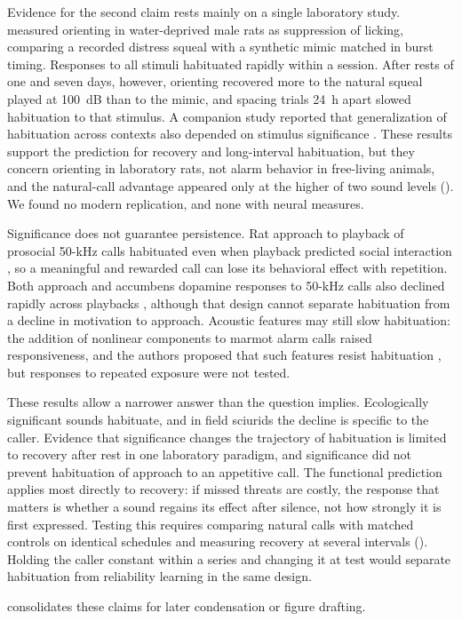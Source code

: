 Evidence for the second claim rests mainly on a single laboratory study. \citet{EvansHammond1983a} measured orienting in water-deprived male rats as suppression of licking, comparing a recorded distress squeal with a synthetic mimic matched in burst timing. Responses to all stimuli habituated rapidly within a session. After rests of one and seven days, however, orienting recovered more to the natural squeal played at 100~dB than to the mimic, and spacing trials 24~h apart slowed habituation to that stimulus.
A companion study reported that generalization of habituation across contexts also depended on stimulus significance \citep{EvansHammond1983b}.
These results support the prediction for recovery and long-interval habituation, but they concern orienting in laboratory rats, not alarm behavior in free-living animals, and the natural-call advantage appeared only at the higher of two sound levels (). We found no modern replication, and none with neural measures.

Significance does not guarantee persistence. Rat approach to playback of prosocial 50-kHz calls habituated even when playback predicted social interaction \citep{BerzEtAl2022}, so a meaningful and rewarded call can lose its behavioral effect with repetition. Both approach and accumbens dopamine responses to 50-kHz calls also declined rapidly across playbacks \citep{WilluhnEtAl2014}, although that design cannot separate habituation from a decline in motivation to approach.
Acoustic features may still slow habituation: the addition of nonlinear components to marmot alarm calls raised responsiveness, and the authors proposed that such features resist habituation \citep{BlumsteinRecapet2009}, but responses to repeated exposure were not tested.

These results allow a narrower answer than the question implies. Ecologically significant sounds habituate, and in field sciurids the decline is specific to the caller. Evidence that significance changes the trajectory of habituation is limited to recovery after rest in one laboratory paradigm, and significance did not prevent habituation of approach to an appetitive call. The functional prediction applies most directly to recovery: if missed threats are costly, the response that matters is whether a sound regains its effect after silence, not how strongly it is first expressed. Testing this requires comparing natural calls with matched controls on identical schedules and measuring recovery at several intervals (). Holding the caller constant within a series and changing it at test would separate habituation from reliability learning in the same design.

 consolidates these claims for later condensation or figure drafting.


